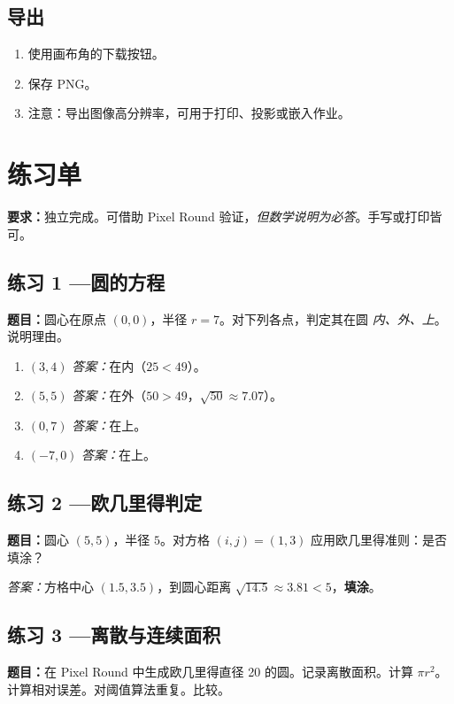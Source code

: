 \documentclass[12pt,a4paper]{scrartcl}
\newcommand{\acc}[1]{\textcolor{accent}{\textbf{#1}}}
\begin{document}
\subsection{导出}
\begin{enumerate}[leftmargin=1.5em,itemsep=0.15em,topsep=0.3em]
  \item 使用画布角的下载按钮。
  \item 保存 PNG。
  \item 注意：导出图像高分辨率，可用于打印、投影或嵌入作业。
\end{enumerate}

\newpage
\section{练习单}\label{ap:lianxi}

\textbf{要求：}独立完成。可借助 Pixel Round 验证，\emph{但数学说明为必答}。手写或打印皆可。

\subsection*{练习 1 ---\quad 圆的方程}
\textbf{题目：}圆心在原点 $(0, 0)$，半径 $r = 7$。对下列各点，判定其在圆 \emph{内、外、上}。说明理由。
\begin{enumerate}[label=\alph*),leftmargin=1.5em,itemsep=0.1em,topsep=0.2em,nosep]
  \item $(3, 4)$ \hfill \emph{答案：}在内（$25 < 49$）。
  \item $(5, 5)$ \hfill \emph{答案：}在外（$50 > 49$，$\sqrt{50} \approx 7.07$）。
  \item $(0, 7)$ \hfill \emph{答案：}在上。
  \item $(-7, 0)$ \hfill \emph{答案：}在上。
\end{enumerate}

\subsection*{练习 2 ---\quad 欧几里得判定}
\textbf{题目：}圆心 $(5, 5)$，半径 $5$。对方格 $(i, j) = (1, 3)$ 应用欧几里得准则：是否填涂？

\emph{答案：}方格中心 $(1.5, 3.5)$，到圆心距离 $\sqrt{14.5} \approx 3.81 < 5$，\acc{填涂}。

\subsection*{练习 3 ---\quad 离散与连续面积}
\textbf{题目：}在 Pixel Round 中生成欧几里得直径 20 的圆。记录离散面积。计算 $\pi r^2$。计算相对误差。对阈值算法重复。比较。
\end{document}
